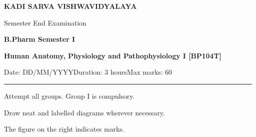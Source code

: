 \documentclass[12pt, a4paper]{exam}
\newcommand{\dxUniversity}{KADI SARVA VISHWAVIDYALAYA}
\newcommand{\dxExamTitle}{Semester End Examination}
\newcommand{\dxProgramLine}{B.Pharm Semester I}
\newcommand{\dxCourse}{Human Anatomy, Physiology and Pathophysiology I [BP104T]}
\newcommand{\dxDate}{DD/MM/YYYY}
\newcommand{\dxDuration}{3 hours}
\newcommand{\dxMaxMarks}{60}
\newcommand{\dxRuledLine}[1]{\par\noindent #1\par\vspace{-0.6ex}\noindent\rule{\linewidth}{1pt}\par}
\begin{document}
\fontsize{11.7}{13.9}\selectfont

\begin{center}
  {\large\textbf{\dxUniversity}}\par
  \dxExamTitle\par
  {\large\textbf{\dxProgramLine}}\par
  {\large\textbf{\dxCourse}}\par
\end{center}
\dxRuledLine{Date: \dxDate\hfill Duration: \dxDuration\hfill Max marks: \dxMaxMarks}
\vspace{0.04in}
{\small
\noindent Attempt all groups. Group I is compulsory.\par
\noindent Draw neat and labelled diagrams wherever necessary.\par
\noindent The figure on the right indicates marks.\par}
\end{document}
